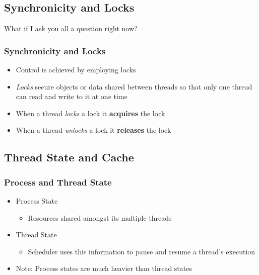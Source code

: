 \documentclass{beamer}
\newcommand{\linespace}{\vskip 0.25cm}
\begin{document}
\subsection[Locks]{Synchronicity and Locks}

\begin{frame}
\begin{center}
What if I ask you all a question right now?
\end{center}
\end{frame}

\begin{frame}
\frametitle{Synchronicity and Locks}

\begin{itemize}
	\item Control is achieved by employing locks
	
	\linespace
	
	\item \emph{Locks} secure objects or data shared between threads so that only one thread can read and write to it at one time

	\linespace

	\item When a thread \emph{locks} a lock it \textbf{acquires} the lock
	\item When a thread \emph{unlocks} a lock it \textbf{releases} the lock
\end{itemize}
\end{frame}

\subsection[Cache]{Thread State and Cache}

\begin{frame}
\frametitle{Process and Thread State}
\begin{itemize}
\item Process State

\begin{itemize}
	\item[] Resources shared amongst its multiple threads
\end{itemize}

\item Thread State
\begin{itemize}
	\item[] Scheduler uses this information to pause and resume a thread's execution
\end{itemize}

\linespace

\item Note: Process states are much heavier than thread states
\end{itemize}
\end{frame}
\end{document}
